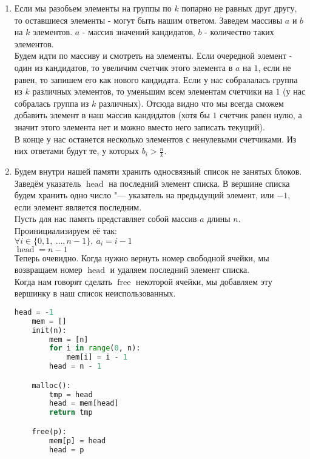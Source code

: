 \documentclass[a4paper, 10pt]{article}
\begin{document}
\begin{enumerate}
\item
\begin{enumerate}
	Если мы разобьем элементы на группы по $k$ попарно не равных друг другу, то оставшиеся элементы - могут быть нашим ответом. Заведем массивы $a$ и $b$ на $k$ элементов. $a$ - массив значений кандидатов, $b$ - количество таких элементов.\\
	Будем идти по массиву и смотреть на элементы. Если очередной элемент - один из кандидатов, то увеличим счетчик этого элемента в $a$ на $1$, если не равен, то запишем его как нового кандидата. Если у нас собралалась группа из $k$ различных элементов, то уменьшим всем элементам счетчики на $1$ (у нас собралась группа из $k$ различных). Отсюда видно что мы всегда сможем добавить элемент в наш массив кандидатов (хотя бы $1$ счетчик равен нулю, а значит этого элемента нет и можно вместо него записать текущий).\\
	В конце у нас останется несколько элементов с ненулевыми счетчиками. Из них ответами будут те, у которых $b_i > \frac{n}{k}$.
\end{enumerate}

\item
\begin{enumerate}
	Будем внутри нашей памяти хранить односвязный список не занятых блоков. Заведём указатель $\operatorname{head}$ на последний элемент списка. В вершине списка будем хранить одно число "--- указатель на предыдущий элемент, или $-1$, если элемент является последним.\\
	Пусть для нас память представляет собой массив $a$ длины $n$.
	Проинициализируем её так:\\$\forall i \in \{0, 1, \medspace \ldots, n - 1\}, \medspace a_i = i - 1$\\
	$\operatorname{head} = n - 1$\\
	Теперь очевидно. Когда нужно вернуть номер свободной ячейки, мы возвращаем номер $\operatorname{head}$ и удаляем последний элемент списка.\\
	Когда нам говорят сделать $\operatorname{free}$ некоторой ячейки, мы добавляем эту вершинку в наш список неиспользованных.\\
	\begin{lstlisting}[language=Python]
	head = -1
	mem = []
	init(n):
		mem = [n]
		for i in range(0, n):
			mem[i] = i - 1
		head = n - 1

	malloc():
		tmp = head
		head = mem[head]
		return tmp

	free(p):
		mem[p] = head
		head = p\end{lstlisting}
\end{enumerate}


\end{enumerate}
\end{document}
